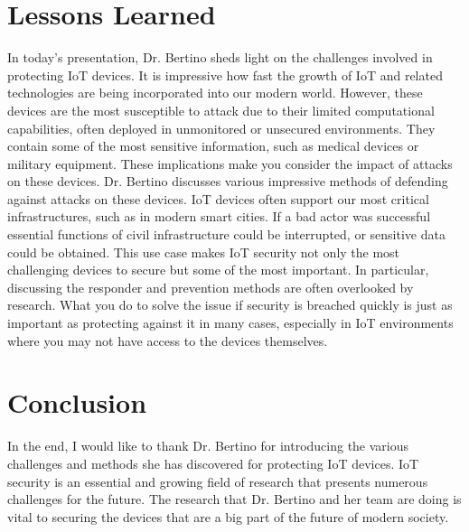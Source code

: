 \documentclass[journal,onecolumn]{IEEEtran}
\begin{document}
\section{Lessons Learned}

In today's presentation, Dr. Bertino sheds light on the challenges involved in protecting IoT devices. It is impressive how fast the growth of IoT and related technologies are being incorporated into our modern world. However, these devices are the most susceptible to attack due to their limited computational capabilities, often deployed in unmonitored or unsecured environments. They contain some of the most sensitive information, such as medical devices or military equipment. These implications make you consider the impact of attacks on these devices. Dr. Bertino discusses various impressive methods of defending against attacks on these devices.  IoT devices often support our most critical infrastructures, such as in modern smart cities. If a bad actor was successful essential functions of civil infrastructure could be interrupted, or sensitive data could be obtained. This use case makes IoT security not only the most challenging devices to secure but some of the most important. In particular, discussing the responder and prevention methods are often overlooked by research. What you do to solve the issue if security is breached quickly is just as important as protecting against it in many cases, especially in IoT environments where you may not have access to the devices themselves. 

\section{Conclusion}

In the end, I would like to thank Dr. Bertino for introducing the various challenges and methods she has discovered for protecting IoT devices. IoT security is an essential and growing field of research that presents numerous challenges for the future. The research that Dr. Bertino and her team are doing is vital to securing the devices that are a big part of the future of modern society. 


\end{document}
